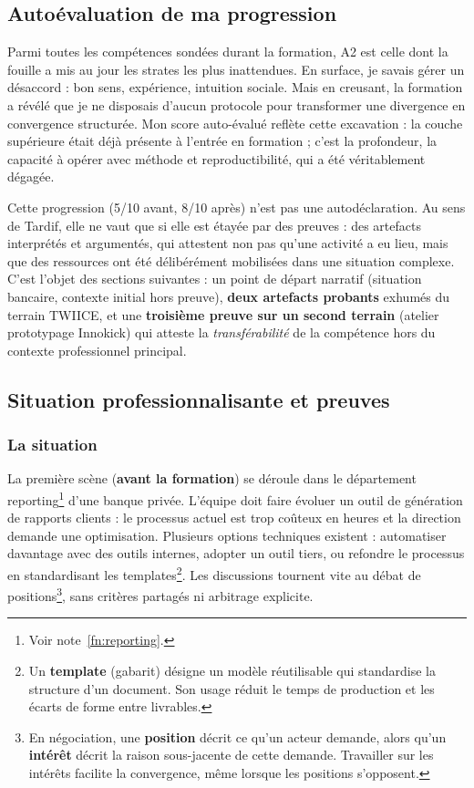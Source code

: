 \subsection{Autoévaluation de ma progression}

Parmi toutes les compétences sondées durant la formation, A2 est celle dont la fouille a mis au jour les strates les plus inattendues. En surface, je savais gérer un désaccord : bon sens, expérience, intuition sociale. Mais en creusant, la formation a révélé que je ne disposais d'aucun protocole pour transformer une divergence en convergence structurée. Mon score auto-évalué reflète cette excavation : la couche supérieure était déjà présente à l'entrée en formation ; c'est la profondeur, la capacité à opérer avec méthode et reproductibilité, qui a été véritablement dégagée.

Cette progression (5/10 avant, 8/10 après) n'est pas une autodéclaration. Au sens de Tardif, elle ne vaut que si elle est étayée par des preuves : des artefacts interprétés et argumentés, qui attestent non pas qu'une activité a eu lieu, mais que des ressources ont été délibérément mobilisées dans une situation complexe. C'est l'objet des sections suivantes : un point de départ narratif (situation bancaire, contexte initial hors preuve), \textbf{deux artefacts probants} exhumés du terrain TWIICE, et une \textbf{troisième preuve sur un second terrain} (atelier prototypage Innokick) qui atteste la \emph{transférabilité} de la compétence hors du contexte professionnel principal.

\subsection{Situation professionnalisante et preuves}

\subsubsection*{La situation}

La première scène (\textbf{avant la formation}) se déroule dans le département reporting\footnote{Voir note~\ref{fn:reporting}.} d'une banque privée. L'équipe doit faire évoluer un outil de génération de rapports clients : le processus actuel est trop coûteux en heures et la direction demande une optimisation. Plusieurs options techniques existent : automatiser davantage avec des outils internes, adopter un outil tiers, ou refondre le processus en standardisant les templates\footnote{Un \textbf{template} (gabarit) désigne un modèle réutilisable qui standardise la structure d'un document. Son usage réduit le temps de production et les écarts de forme entre livrables.}. Les discussions tournent vite au débat de positions\footnote{En négociation, une \textbf{position} décrit ce qu'un acteur demande, alors qu'un \textbf{intérêt} décrit la raison sous-jacente de cette demande. Travailler sur les intérêts facilite la convergence, même lorsque les positions s'opposent.}, sans critères partagés ni arbitrage explicite.

